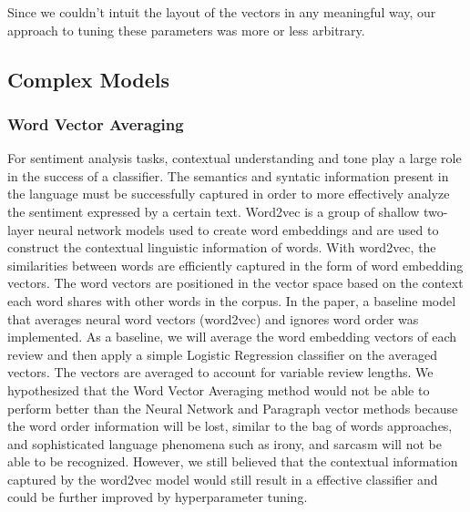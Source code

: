 \documentclass[conference]{IEEEtran}
\begin{document}
Since we couldn't intuit the layout of the vectors in any meaningful way, our approach to tuning these parameters was more or less arbitrary.

\subsection{Complex Models}


\subsubsection{Word Vector Averaging}
 
For sentiment analysis tasks, contextual understanding and tone play a large role in the success of a classifier. The semantics and syntatic information present in the language must be successfully captured in order to more effectively analyze the sentiment expressed by a certain text. Word2vec is a group of shallow two-layer neural network models used to create word embeddings and are used to construct the contextual linguistic information of words. With word2vec, the similarities between words are efficiently captured in the form of word embedding vectors.  The word vectors are positioned in the vector space based on the context each word shares with other words in the corpus. In the paper, a baseline model that averages neural word vectors (word2vec) and ignores word order was implemented. As a baseline, we will average the word embedding vectors of each review and then apply a simple Logistic Regression classifier on the averaged vectors. The vectors are averaged to account for variable review lengths. We hypothesized that the Word Vector Averaging method would not be able to perform better than the Neural Network and Paragraph vector methods because the word order information will be lost, similar to the bag of words approaches, and sophisticated language phenomena such as irony, and sarcasm will not be able to be recognized. However, we still believed that the contextual information captured by the word2vec model would still result in a effective classifier and could be further improved by hyperparameter tuning.
\end{document}
